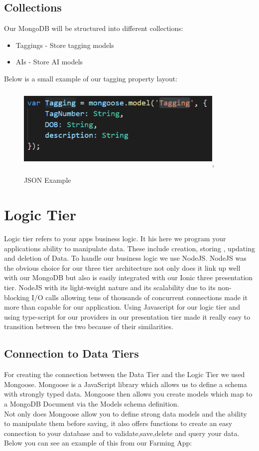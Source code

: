 \documentclass[12pt,a4paper,oneside,openany]{book}
\begin{document}
\subsection{Collections}
Our MongoDB will be structured into different collections:\cite{Collections}

\begin{itemize}
    \item Taggings - Store tagging models
    \item AIs - Store AI models
\end{itemize}

Below is a small example of our tagging property layout:
    
\begin{figure}[ht]
\renewcommand\thefigure{5.2}
\centering
\includegraphics[width=10cm,height=4cm]{Images/modelJSON.png},
\caption{JSON Example}
\label{json}
\end{figure}


\section{Logic Tier}
Logic tier refers to your apps business logic. It his here we program your applications ability to manipulate data. These include creation, storing , updating and deletion of Data. To handle our business logic we use NodeJS. NodeJS was the obvious choice for our three tier architecture not only does it link up well with our MongoDB but also is easily integrated with our Ionic three presentation tier. NodeJS with its light-weight nature and its scalability due to its non-blocking I/O calls allowing tens of thousands of concurrent connections made it more than capable for our application. Using Javascript for our logic tier and using type-script for our providers in our presentation tier made it really easy to transition between the two because of their similarities.

\subsection{Connection to Data Tiers}
For creating the connection between the Data Tier and the Logic Tier we used Mongoose. Mongoose is a JavaScript library which allows us to define a schema with strongly typed data. Mongoose then allows you create models which map to a MongoDB Document via the Models schema definition. \cite{mongoose}
\\
Not only does Mongoose allow you to deﬁne strong data models and the ability to manipulate them before saving, it also oﬀers functions to create an easy connection to your database and to validate,save,delete and query your data. Below you can see an example of this from our Farming App: 
\end{document}
